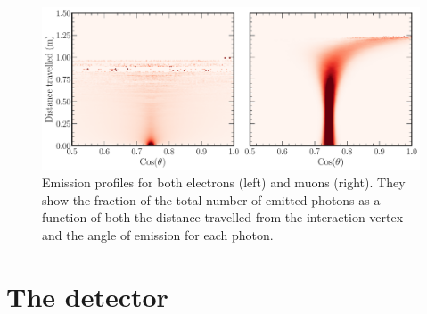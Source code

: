 \begin{figure} %
    \includegraphics[width=\textwidth]{diagrams/4-chips/emission_profile.pdf}
    \caption[Emission profiles for both electrons and muons]
    {Emission profiles for both electrons (left) and muons (right). They show the fraction of the
        total number of emitted photons as a function of both the distance travelled from the
        interaction vertex and the angle of emission for each photon.}
    \label{fig:emission_profile}
\end{figure}

\section{The \chipsfive detector} %
\label{sec:chips_detector} %

